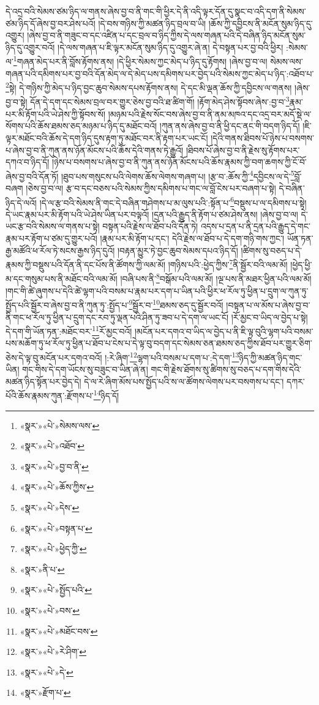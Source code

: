 དེ་འདྲ་བའི་སེམས་ཙམ་ཉིད་ལ་གནས་ཞེས་བྱ་བ་ནི་གང་གི་ཕྱིར་དེ་ནི་འདི་ལྟར་དོན་དུ་སྣང་བ་འདི་དག་ནི་སེམས་ཙམ་ཉིད་དོ་ཞེས་བྱ་བར་ཤེས་པའོ། །དེ་བས་གཉིས་ཀྱི་མཚན་ཉིད་བྲལ་བ་ཡི། །ཆོས་ཀྱི་དབྱིངས་ནི་མངོན་སུམ་ཉིད་དུ་འགྱུར། །ཞེས་བྱ་བ་ནི་གཟུང་བ་དང་འཛིན་པ་དང་བྲལ་བ་ཉིད་ཀྱིས་དེ་ལས་གཞན་པའི་དེ་བཞིན་ཉིད་མངོན་སུམ་ཉིད་དུ་འགྱུར་བའོ། །དེ་ལས་གཞན་པ་ཇི་ལྟར་མངོན་སུམ་ཉིད་དུ་འགྱུར་ཞེ་ན། དེ་བསྟན་པར་བྱ་བའི་ཕྱིར། :སེམས་ལ་\footnote{«སྣར་»«པེ་»སེམས་ལས་}གཞན་མེད་པར་ནི་བློས་རྟོགས་ནས། །དེ་ཕྱིར་སེམས་ཀྱང་མེད་པ་ཉིད་དུ་རྟོགས། །ཞེས་བྱ་བ་ལ། སེམས་ལས་གཞན་པའི་དམིགས་པར་བྱ་བའི་དོན་མེད་ལ་དེ་མེད་པས་དམིགས་པར་བྱེད་པའི་སེམས་ཀྱང་མེད་པ་ཉིད་:འཐོབ་པ་\footnote{«སྣར་»«པེ་»འཐོབ་}སྟེ། དེ་གཉིས་ཀྱི་མེད་པ་ཉིད་བྱང་ཆུབ་སེམས་དཔས་རྟོགས་ནས། དེ་དང་མི་ལྡན་ཆོས་ཀྱི་དབྱིངས་ལ་གནས། །ཞེས་བྱ་བ་སྟེ། དོན་དེ་དག་དང་སེམས་བྲལ་བར་གྱུར་ཅེས་བྱ་བའི་ཐ་ཚིག་གོ། །རྟོག་མེད་ཤེས་སྟོབས་ཞེས་:བྱ་བ་\footnote{«སྣར་»«པེ་»བྱ་བ་ནི་}རྣམ་པར་མི་རྟོག་པའི་ཡེ་ཤེས་ཀྱི་སྟོབས་སོ། །མཉམ་པའི་རྗེས་སོང་བས་ཞེས་བྱ་བ་ནི་ནམ་མཁའ་དང་འདྲ་བར་མདོ་སྡེ་ལ་སོགས་པའི་ཆོས་ཐམས་ཅད་མཉམ་པ་ཉིད་དུ་མཐོང་བའོ། །ཀུན་ནས་ཞེས་བྱ་བ་ནི་ཕྱི་དང་ནང་གི་བདག་ཉིད་དོ། །ཇི་ལྟར་མཐོང་བའི་ཆོས་དེ་དག་ཉིད་དུས་རྟག་ཏུ་མཐོང་བར་ནི་རྟག་པར་ཡང་ངོ། །དེའི་གནས་ཐིབས་པོ་ཉེས་པ་བསགས་པ་ཞེས་བྱ་བ་ནི་ཀུན་ནས་ཉོན་མོངས་པའི་ཆོས་དེའི་གནས་ཏེ་རྒྱུའོ། །ཐིབས་པོ་ཞེས་བྱ་བ་ནི་རྗེས་སུ་རྟོགས་པར་དཀའ་བ་ཉིད་དོ། །ཉེས་པ་བསགས་པ་ཞེས་བྱ་བ་ནི་ཀུན་ནས་ཉོན་མོངས་པའི་ཆོས་རྣམས་ཀྱི་བག་ཆགས་ཀྱི་ངོ་བོ་ཞེས་བྱ་བའི་དོན་ཏོ། །ཐུབ་པས་གསུངས་པའི་ལེགས་ཆོས་ལེགས་གཞག་པ། །རྩ་བ་:ཆོས་ཀྱི་\footnote{«སྣར་»«པེ་»ཆོས་ཀྱིས་}དབྱིངས་ལ་དེ་\footnote{«སྣར་»«པེ་»དེས་}བློ་བཞག །ཅེས་བྱ་བ་ལ། རྩ་བ་དང་བཅས་པའི་སེམས་ཀྱིས་དམིགས་པ་གང་ལ་བློ་ངེས་པར་བཞག་པ་སྟེ། དེ་བཞིན་ཉིད་དེ་ལའོ། །དེ་ལ་རྩ་བའི་སེམས་ནི་གང་དེ་བཞིན་གཤེགས་པ་མ་ལུས་པའི་:སྟོན་པ་\footnote{«སྣར་»«པེ་»བསྟན་པ་}བསྡུས་པ་ལ་དམིགས་པ་སྟེ། དེ་ཡང་རྣམ་པར་མི་རྟོག་པའི་ཡེ་ཤེས་ཡིན་པར་བལྟའོ། །དྲན་པའི་རྒྱུད་ནི་རྟོག་པ་ཙམ་ཤེས་ནས། །ཞེས་བྱ་བ་ལ། དེ་ཡང་རྩ་བའི་སེམས་ལ་གནས་པ་སྟེ། བསྟན་པའི་རྗེས་ལ་ཐོབ་པའི་དོན་ཏེ། འདས་པ་དྲན་པ་ནི་དྲན་པའི་རྒྱུད་དེ་གང་རྣམ་པར་རྟོག་པ་ཙམ་དུ་གྱུར་པའོ། །རྣམ་པར་མི་རྟོག་པ་དང་། དེའི་རྗེས་ལ་ཐོབ་པ་དེ་དག་གཉི་གས་ཀྱང་། ཡོན་ཏན་རྒྱ་མཚོའི་ཕ་རོལ་ཏེ་སངས་རྒྱས་ཉིད་དུའོ། །བརྟན་མྱུར་ཏེ་བྱང་ཆུབ་སེམས་དཔའ་ཉིད་དོ། །ཚིགས་སུ་བཅད་པ་དེ་རྣམས་ཀྱི་བསྡུས་པའི་དོན་ནི་དང་པོས་ནི་ཚོགས་ཀྱི་ལམ་མོ། །གཉིས་པའི་:ཕྱེད་ཀྱིས་\footnote{«སྣར་»«པེ་»ཕྱེད་ཀྱི་}ནི་སྦྱོར་བའི་ལམ་མོ། །ཕྱེད་ཕྱི་མ་དང་གསུམ་པས་ནི་མཐོང་བའི་ལམ་མོ། །བཞི་པས་ནི་\footnote{«སྣར་»ནི་པ་}བསྒོམ་པའི་ལམ་མོ། །ལྔ་པས་ནི་མཐར་ཕྱིན་པའི་ལམ་མོ། །གང་གི་ཚེ་ཞུགས་པ་དེའི་ཚེ་ལྷག་པའི་བསམ་པ་རྣམ་པར་དག་པ་ཡིན་པའི་ཕྱིར་ཕ་རོལ་ཏུ་ཕྱིན་པ་དྲུག་ལ་ཀུན་ཏུ་སྤྱོད་པའི་སྦྱོར་བ་ཞེས་བྱ་བ་ནི་ཀུན་ཏུ་:སྤྱོད་པ་\footnote{«སྣར་»«པེ་»སྤྱོད་པའི་}སྦྱོར་བ་\footnote{«སྣར་»«པེ་»བས་}ཐམས་ཅད་དུ་སྦྱོར་བའོ། །བསྟན་པ་ལ་མོས་པ་ཞེས་བྱ་བ་ནི་གང་ཕ་རོལ་ཏུ་ཕྱིན་པ་དྲུག་དང་རབ་ཏུ་ལྡན་པའི་ཤིན་ཏུ་ཟབ་པ་དེ་དག་ལ་ཡང་ངོ། །རོ་མྱང་བ་ཡིད་ལ་བྱེད་པ་སྟེ། དེ་དག་གི་ཡོན་ཏན་:མཐོང་བར་\footnote{«སྣར་»«པེ་»མཐོང་བས་}རོ་མྱང་བའོ། །མངོན་པར་དགའ་བ་ཡིད་ལ་བྱེད་པ་ནི་ཇི་ལྟ་བུའི་ལྷག་པའི་བསམ་པས་མཆོག་ཏུ་ཕ་རོལ་ཏུ་ཕྱིན་པ་ཐོབ་པ་ངེས་པ་དེ་ལྟ་བུ་བདག་དང་སེམས་ཅན་ཐམས་ཅད་ཀྱིས་ཐོབ་པར་གྱུར་ཅིག་ཅེས་དེ་ལྟ་བུ་མངོན་པར་དགའ་བའོ། །:རེ་ཞིག་\footnote{«སྣར་»«པེ་»རེ་ཤིག་}ལྷག་པའི་བསམ་པ་དག་པ་:དེ་དག་\footnote{«སྣར་»«པེ་»དེ་}ཉིད་ཀྱི་མཚན་ཉིད་གང་ཡིན། གང་གིས་དེ་དག་ཡོངས་སུ་བཟུང་བ་ཡིན་ཞེ་ན། གང་གི་རྗེས་ཐོགས་སུ་ཚིགས་སུ་བཅད་པ་དག་གིས་དེའི་མཚན་ཉིད་སྟོན་པར་བྱེད་དེ། དེ་ལ་རེ་ཞིག་མོས་པས་སྤྱོད་པའི་ས་ལ་ཚོགས་ལེགས་པར་བསགས་པ་དང་། དཀར་པོའི་ཆོས་རྣམས་ཀུན་:རྫོགས་པ་\footnote{«སྣར་»རྫོག་པ་}ཉིད་དོ། 